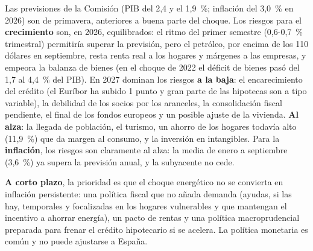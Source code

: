 \begin{examen}
Las previsiones de la Comisión (PIB del 2,4 y el 1,9~\%; inflación del 3,0~\% en 2026) son de primavera, anteriores a buena parte del choque. Los riesgos para el \textbf{crecimiento} son, en 2026, equilibrados: el ritmo del primer semestre (0,6-0,7~\% trimestral) permitiría superar la previsión, pero el petróleo, por encima de los 110 dólares en septiembre, resta renta real a los hogares y márgenes a las empresas, y empeora la balanza de bienes (en el choque de 2022 el déficit de bienes pasó del 1,7 al 4,4~\% del PIB). En 2027 dominan los riesgos \textbf{a la baja}: el encarecimiento del crédito (el Euríbor ha subido 1 punto y gran parte de las hipotecas son a tipo variable), la debilidad de los socios por los aranceles, la consolidación fiscal pendiente, el final de los fondos europeos y un posible ajuste de la vivienda. \textbf{Al alza}: la llegada de población, el turismo, un ahorro de los hogares todavía alto (11,9~\%) que da margen al consumo, y la inversión en intangibles. Para la \textbf{inflación}, los riesgos son claramente al alza: la media de enero a septiembre (3,6~\%) ya supera la previsión anual, y la subyacente no cede.

\textbf{A corto plazo}, la prioridad es que el choque energético no se convierta en inflación persistente: una política fiscal que no añada demanda (ayudas, si las hay, temporales y focalizadas en los hogares vulnerables y que mantengan el incentivo a ahorrar energía), un pacto de rentas y una política macroprudencial preparada para frenar el crédito hipotecario si se acelera. La política monetaria es común y no puede ajustarse a España.


\end{examen}

